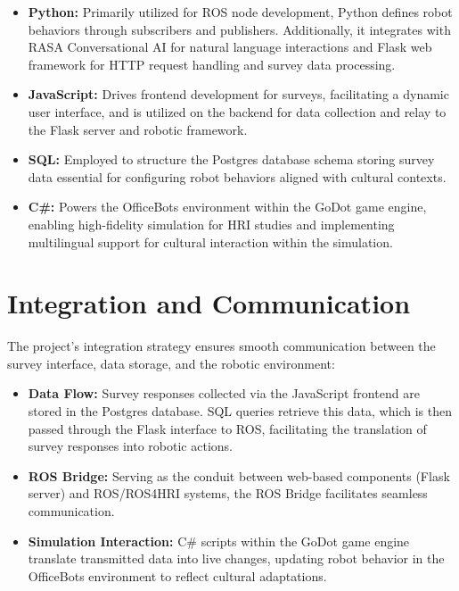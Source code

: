 \begin{itemize}
    \item \textbf{Python:} Primarily utilized for ROS node development, Python defines robot behaviors through subscribers and publishers. Additionally, it integrates with RASA Conversational AI for natural language interactions and Flask web framework for HTTP request handling and survey data processing.
    \item \textbf{JavaScript:} Drives frontend development for surveys, facilitating a dynamic user interface, and is utilized on the backend for data collection and relay to the Flask server and robotic framework.
    \item \textbf{SQL:} Employed to structure the Postgres database schema storing survey data essential for configuring robot behaviors aligned with cultural contexts.
    \item \textbf{C\#:} Powers the OfficeBots environment within the GoDot game engine, enabling high-fidelity simulation for HRI studies and implementing multilingual support for cultural interaction within the simulation.
\end{itemize}

\section{Integration and Communication}

The project's integration strategy ensures smooth communication between the survey interface, data storage, and the robotic environment:

\begin{itemize}
    \item \textbf{Data Flow:} Survey responses collected via the JavaScript frontend are stored in the Postgres database. SQL queries retrieve this data, which is then passed through the Flask interface to ROS, facilitating the translation of survey responses into robotic actions.
    \item \textbf{ROS Bridge:} Serving as the conduit between web-based components (Flask server) and ROS/ROS4HRI systems, the ROS Bridge facilitates seamless communication.
    \item \textbf{Simulation Interaction:} C\# scripts within the GoDot game engine translate transmitted data into live changes, updating robot behavior in the OfficeBots environment to reflect cultural adaptations.
\end{itemize}


